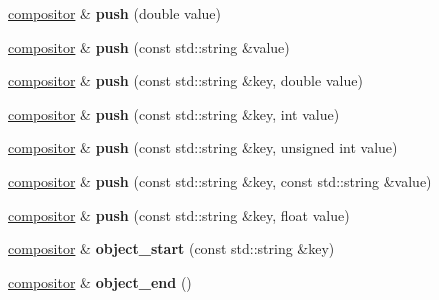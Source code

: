 \begin{DoxyCompactItemize}
\hyperlink{structmods_1_1jx_1_1compositor}{compositor} \& {\bfseries push} (double value)
\item 
\mbox{\label{structmods_1_1jx_1_1compositor_a735d06965c090f6611af8f56eb77f8ff}} 
\hyperlink{structmods_1_1jx_1_1compositor}{compositor} \& {\bfseries push} (const std\+::string \&value)
\item 
\mbox{\label{structmods_1_1jx_1_1compositor_a8fe7ca69face37a80bc08334e5649c03}} 
\hyperlink{structmods_1_1jx_1_1compositor}{compositor} \& {\bfseries push} (const std\+::string \&key, double value)
\item 
\mbox{\label{structmods_1_1jx_1_1compositor_a878de2a0eedbad64182bb0226860d90a}} 
\hyperlink{structmods_1_1jx_1_1compositor}{compositor} \& {\bfseries push} (const std\+::string \&key, int value)
\item 
\mbox{\label{structmods_1_1jx_1_1compositor_aee473dbd04ce305a4b23eea3aa9e7e44}} 
\hyperlink{structmods_1_1jx_1_1compositor}{compositor} \& {\bfseries push} (const std\+::string \&key, unsigned int value)
\item 
\mbox{\label{structmods_1_1jx_1_1compositor_ab7a8c83172d86e3d097b4ca3c9256bd3}} 
\hyperlink{structmods_1_1jx_1_1compositor}{compositor} \& {\bfseries push} (const std\+::string \&key, const std\+::string \&value)
\item 
\mbox{\label{structmods_1_1jx_1_1compositor_a457c82f618838b2527dbf0b81d2782b3}} 
\hyperlink{structmods_1_1jx_1_1compositor}{compositor} \& {\bfseries push} (const std\+::string \&key, float value)
\item 
\mbox{\label{structmods_1_1jx_1_1compositor_a1b2971dc62ddb524fc6a799e8e97b1a4}} 
\hyperlink{structmods_1_1jx_1_1compositor}{compositor} \& {\bfseries object\+\_\+start} (const std\+::string \&key)
\item 
\mbox{\label{structmods_1_1jx_1_1compositor_aeb73fecbacb437db1c22c9a32b8ce6d8}} 
\hyperlink{structmods_1_1jx_1_1compositor}{compositor} \& {\bfseries object\+\_\+end} ()

\end{DoxyCompactItemize}
